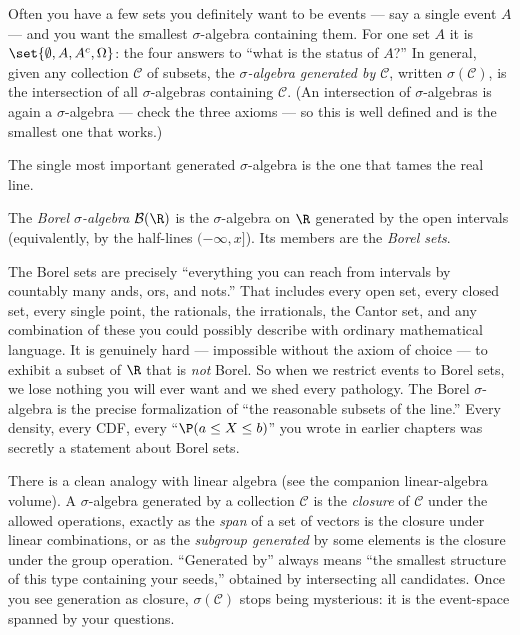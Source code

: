 \begin{example}
\label{ch36:generated}
Often you have a few sets you definitely want to be events --- say a single
event $A$ --- and you want the smallest $\sigma$-algebra containing them. For one
set $A$ it is $\set{\emptyset, A, A^c, \Omega}$: the four answers to ``what is the
status of $A$?'' In general, given any collection $\mathcal{C}$ of subsets, the
\emph{$\sigma$-algebra generated by $\mathcal{C}$}, written $\sigma(\mathcal{C})$,
is the intersection of all $\sigma$-algebras containing $\mathcal{C}$. (An
intersection of $\sigma$-algebras is again a $\sigma$-algebra --- check the three
axioms --- so this is well defined and is the smallest one that works.)
\end{example}

The single most important generated $\sigma$-algebra is the one that tames the
real line.

\begin{definition}
\label{ch36:borel}
The \emph{Borel $\sigma$-algebra} $\mathcal{B}(\R)$ is the $\sigma$-algebra on
$\R$ generated by the open intervals (equivalently, by the half-lines
$(-\infty, x]$). Its members are the \emph{Borel sets}.
\end{definition}

\begin{happeningbox}
The Borel sets are precisely ``everything you can reach from intervals by
countably many ands, ors, and nots.'' That includes every open set, every closed
set, every single point, the rationals, the irrationals, the Cantor set, and any
combination of these you could possibly describe with ordinary mathematical
language. It is genuinely hard --- impossible without the axiom of choice --- to
exhibit a subset of $\R$ that is \emph{not} Borel. So when we restrict events to
Borel sets, we lose nothing you will ever want and we shed every pathology. The
Borel $\sigma$-algebra is the precise formalization of ``the reasonable subsets of
the line.'' Every density, every CDF, every ``$\P(a \le X \le b)$'' you wrote in
earlier chapters was secretly a statement about Borel sets.
\end{happeningbox}

\begin{connectionbox}
There is a clean analogy with linear algebra (see the companion linear-algebra
volume). A $\sigma$-algebra generated by a collection $\mathcal{C}$ is the
\emph{closure} of $\mathcal{C}$ under the allowed operations, exactly as the
\emph{span} of a set of vectors is the closure under linear combinations, or as
the \emph{subgroup generated} by some elements is the closure under the group
operation. ``Generated by'' always means ``the smallest structure of this type
containing your seeds,'' obtained by intersecting all candidates. Once you see
generation as closure, $\sigma(\mathcal{C})$ stops being mysterious: it is the
event-space spanned by your questions.
\end{connectionbox}

